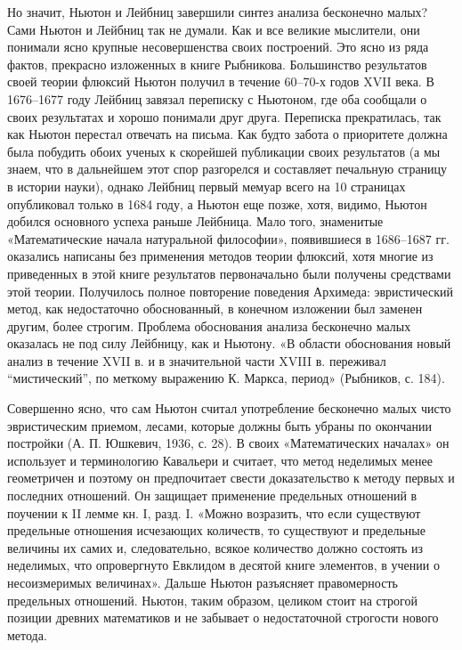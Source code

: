 Но значит, Ньютон и Лейбниц завершили синтез анализа бесконечно малых?
Сами Ньютон и Лейбниц так не  думали. Как и все великие мыслители, они
понимали  ясно крупные  несовершенства своих  построений. Это  ясно из
ряда  фактов,  прекрасно  изложенных в  книге  Рыбникова.  Большинство
результатов  своей теории  флюксий Ньютон  получил в  течение 60--70-х
годов  XVII  века.  В  1676--1677 году  Лейбниц  завязал  переписку  с
Ньютоном, где оба сообщали о  своих результатах и хорошо понимали друг
друга.  Переписка  прекратилась,  так  как  Ньютон  перестал  отвечать
на  письма.  Как  будто  забота  о  приоритете  должна  была  побудить
обоих ученых  к скорейшей  публикации своих  результатов (а  мы знаем,
что  в   дальнейшем  этот  спор  разгорелся   и  составляет  печальную
страницу в  истории науки), однако  Лейбниц первый мемуар всего  на 10
страницах  опубликовал  только  в  1684  году,  а  Ньютон  еще  позже,
хотя,  видимо,  Ньютон  добился   основного  успеха  раньше  Лейбница.
Мало того,  знаменитые «Математические начала  натуральной философии»,
появившиеся в 1686--1687 гг. оказались написаны без применения методов
теории флюксий,  хотя многие из  приведенных в этой  книге результатов
первоначально были получены средствами  этой теории. Получилось полное
повторение поведения  Архимеда: эвристический метод,  как недостаточно
обоснованный, в конечном изложении  был заменен другим, более строгим.
Проблема обоснования  анализа бесконечно  малых оказалась не  под силу
Лейбницу, как и Ньютону. «В области обоснования новый анализ в течение
XVII в. и в значительной  части XVIII в. переживал ``мистический'', по
меткому выражению К. Маркса, период» (Рыбников, с. 184).

Совершенно ясно,  что сам Ньютон считал  употребление бесконечно малых
чисто  эвристическим  приемом,  лесами,  которые  должны  быть  убраны
по  окончании  постройки  (А.  П.  Юшкевич,  1936,  с.  28).  В  своих
«Математических  началах»  он   использует  и  терминологию  Кавальери
и  считает,  что  метод  неделимых  менее  геометричен  и  поэтому  он
предпочитает  свести  доказательство  к   методу  первых  и  последних
отношений. Он защищает применение предельных отношений в поучении к II
лемме кн. I, разд. I. «Можно возразить, что если существуют предельные
отношения исчезающих  количеств, то  существуют и  предельные величины
их  самих  и,  следовательно,  всякое количество  должно  состоять  из
неделимых,  что  опровергнуто  Евклидом  в  десятой  книге  элементов,
в  учении   о  несоизмеримых  величинах».  Дальше   Ньютон  разъясняет
правомерность  предельных отношений.  Ньютон,  таким образом,  целиком
стоит  на  строгой  позиции  древних   математиков  и  не  забывает  о
недостаточной строгости нового метода.

